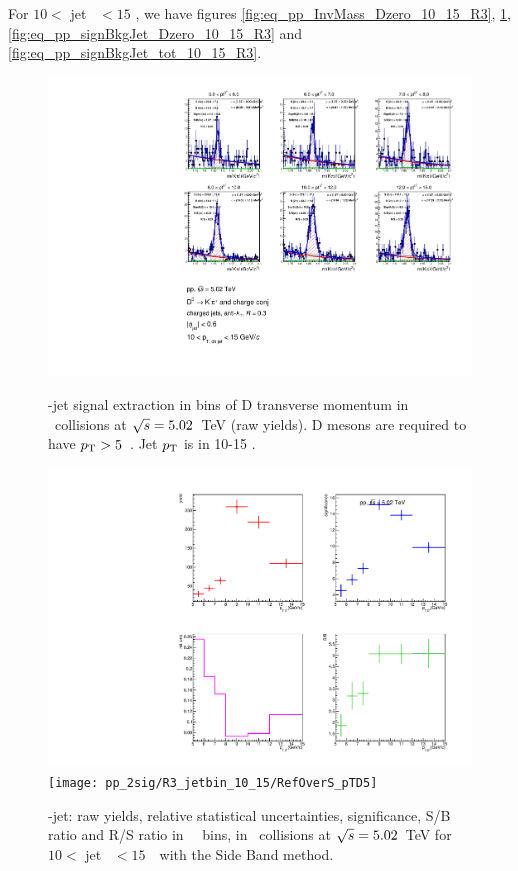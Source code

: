 For $10<$ jet \pt\ $<15$ \GeVc, we have figures \ref{fig:eq_pp_InvMass_Dzero_10_15_R3}, \ref{fig:eq_pp_signalParams_10_15_R3}, \ref{fig:eq_pp_signBkgJet_Dzero_10_15_R3} and \ref{fig:eq_pp_signBkgJet_tot_10_15_R3}.

\begin{figure}[bth]
\centering
\begin{minipage}{.65\textwidth}
  \centering
  \includegraphics[width=\linewidth]{pp_2sig/R3_jetbin_10_15/invMass_pTD5}
\caption{\Dzero-jet signal extraction in bins of D transverse momentum in \pp\ collisions at $\sqrt{s}=5.02$~TeV (raw yields). D mesons are required to have $p_{\rm T}>5$~\GeVc. Jet $p_{\rm T}$ is in 10-15 \GeVc.
}
\label{fig:eq_pp_InvMass_Dzero_10_15_R3}
\end{minipage}%
\begin{minipage}{.4\textwidth}
  \centering
  \includegraphics[width=\linewidth]{pp_2sig/R3_jetbin_10_15/signalParams_pTD5}
  \texttt{[image: pp\_2sig/R3\_jetbin\_10\_15/RefOverS\_pTD5]}
\caption{%
\Dzero-jet: raw yields, relative statistical uncertainties, significance, S/B ratio and R/S ratio in \Dzero\ \pt\ bins, in \pp\ collisions at $\sqrt{s}=5.02$~TeV for $10<$ jet \pt\ $<15$~\GeVc\ with the Side Band method.
}
\label{fig:eq_pp_signalParams_10_15_R3}
\end{minipage}
\end{figure}
